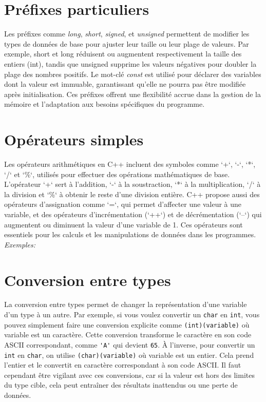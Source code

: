 


\section{Préfixes particuliers}
Les préfixes comme \emph{long}, \emph{short}, \emph{signed}, et \emph{unsigned} permettent de modifier les types de données de base pour ajuster leur taille ou leur plage de valeurs. Par exemple, short et long réduisent ou augmentent respectivement la taille des entiers (int), tandis que unsigned supprime les valeurs négatives pour doubler la plage des nombres positifs. Le mot-clé \emph{const} est utilisé pour déclarer des variables dont la valeur est immuable, garantissant qu’elle ne pourra pas être modifiée après initialisation. Ces préfixes offrent une flexibilité accrue dans la gestion de la mémoire et l’adaptation aux besoins spécifiques du programme.

\section{Opérateurs simples}
Les opérateurs arithmétiques en C++ incluent des symboles comme `+`, `-`, `*`, `/` et `\%`, utilisés pour effectuer des opérations mathématiques de base. L'opérateur `+` sert à l'addition, `-` à la soustraction, `*` à la multiplication, `/` à la division et `\%` à obtenir le reste d'une division entière. C++ propose aussi des opérateurs d'assignation comme `=`, qui permet d'affecter une valeur à une variable, et des opérateurs d'incrémentation (`++`) et de décrémentation (`--`) qui augmentent ou diminuent la valeur d'une variable de 1. Ces opérateurs sont essentiels pour les calculs et les manipulations de données dans les programmes. \emph{Exemples:}



\section{Conversion entre types}
La conversion entre types permet de changer la représentation d'une variable d’un type à un autre. Par exemple, si vous voulez convertir un \lstinline|char| en \lstinline|int|, vous pouvez simplement faire une conversion explicite comme \lstinline|(int)(variable)| où variable est un caractère. Cette conversion transforme le caractère en son code ASCII correspondant, comme \lstinline|'A'| qui devient \lstinline|65|. À l'inverse, pour convertir un \lstinline|int| en \lstinline|char|, on utilise \lstinline|(char)(variable)| où variable est un entier. Cela prend l'entier et le convertit en caractère correspondant à son code ASCII. Il faut cependant être vigilant avec ces conversions, car si la valeur est hors des limites du type cible, cela peut entraîner des résultats inattendus ou une perte de données.